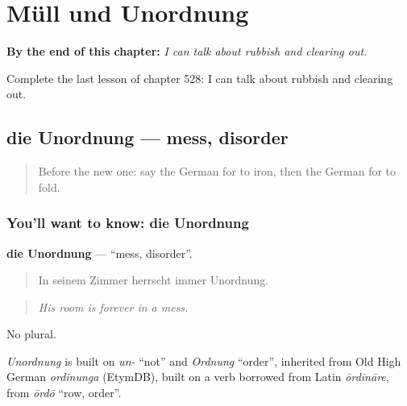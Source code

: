 
\chapter{Müll und Unordnung}
\label{ch:ge-mull-und-unordnung}

\begin{chapteropening}
\textbf{By the end of this chapter:} \emph{I can talk about rubbish and clearing out.}

Complete the last lesson of chapter 528: I can talk about rubbish and clearing out.
\end{chapteropening}

\section[die Unordnung]{die Unordnung — mess, disorder}

\label{lesson:GE-C528-unordnung}



\begin{quote}
Before the new one: say the German for to iron, then the German for to fold.
\end{quote}

\subsection*{You'll want to know: die Unordnung}
\textbf{die Unordnung} — \textquotedblleft{}mess, disorder\textquotedblright{}.

\begin{quote}
In seinem Zimmer herrscht immer Unordnung.
\end{quote}

\begin{quote}
\emph{His room is forever in a mess.}
\end{quote}

No plural.

\begin{cousinweb}
\emph{Unordnung} is built on \emph{un-} \textquotedblleft{}not\textquotedblright{} and \emph{Ordnung} \textquotedblleft{}order\textquotedblright{}, inherited from Old High German \emph{ordinunga} (EtymDB), built on a verb borrowed from Latin \emph{ōrdināre}, from \emph{ōrdō} \textquotedblleft{}row, order\textquotedblright{}.
\end{cousinweb}

